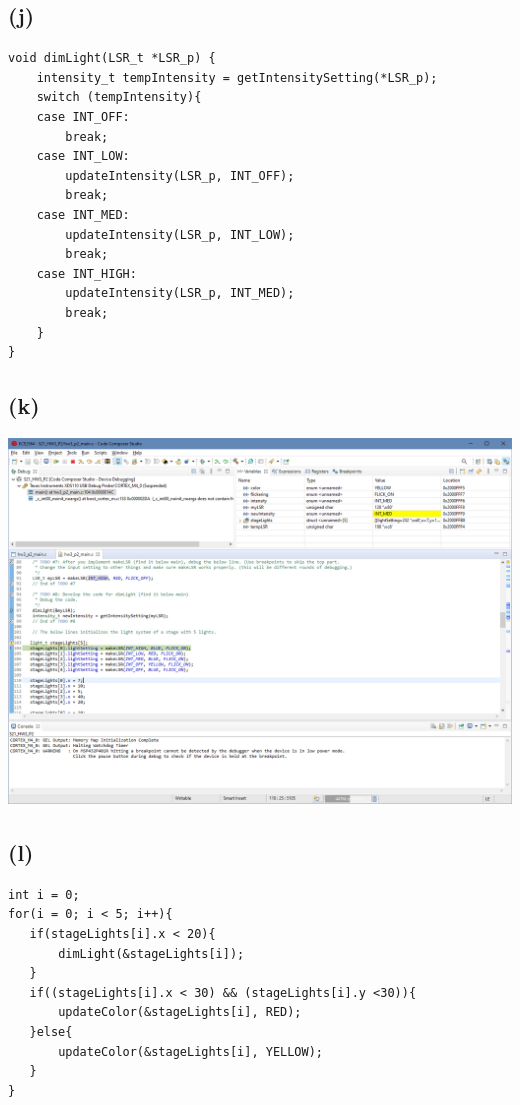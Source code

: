 \documentclass{article}
\begin{document}
\subsection*{(j)}
\begin{center}
        \lstset{language=C}
        \lstset{frame=lines}
        \lstset{basicstyle=\footnotesize}
        \begin{lstlisting}
void dimLight(LSR_t *LSR_p) {
    intensity_t tempIntensity = getIntensitySetting(*LSR_p);
    switch (tempIntensity){
    case INT_OFF:
        break;
    case INT_LOW:
        updateIntensity(LSR_p, INT_OFF);
        break;
    case INT_MED:
        updateIntensity(LSR_p, INT_LOW);
        break;
    case INT_HIGH:
        updateIntensity(LSR_p, INT_MED);
        break;
    }
}
        \end{lstlisting}
\end{center}
\subsection*{(k)}
\begin{center}
    \includegraphics[width = \textwidth]{k.png}
\end{center}
\newpage
\subsection*{(l)}
\begin{center}
        \lstset{language=C}
        \lstset{frame=lines}
        \lstset{basicstyle=\footnotesize}
        \begin{lstlisting}
int i = 0;
for(i = 0; i < 5; i++){
   if(stageLights[i].x < 20){
       dimLight(&stageLights[i]);
   }
   if((stageLights[i].x < 30) && (stageLights[i].y <30)){
       updateColor(&stageLights[i], RED);
   }else{
       updateColor(&stageLights[i], YELLOW);
   }
}
        \end{lstlisting}
\end{center}
\end{document}

